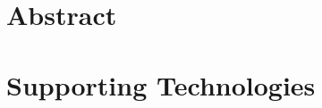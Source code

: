 \documentclass[ %
                    author={Louis Wang},
                supervisor={Dr. Qiang Liu},
                    degree={MSc},
                     title={Identification of Suicide Ideation in Texts},
                      type={},
                      year={2024}]{dissertation}
\begin{document}



\maketitle


\frontmatter


\makedecl


\tableofcontents
\listoffigures
\listoftables
\listofalgorithms
\lstlistoflistings



\chapter*{Abstract}



\chapter*{Supporting Technologies}
\end{document}
